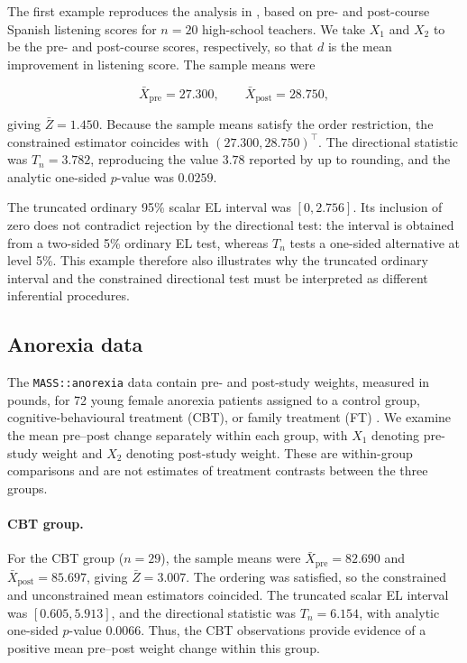 \documentclass[11pt]{article}
\theoremstyle{remark}
\begin{document}
The first example reproduces the analysis in \citet[Example~3]{el1996empirical}, based on pre- and post-course Spanish listening scores for $n=20$ high-school teachers. We take $X_1$ and $X_2$ to be the pre- and post-course scores, respectively, so that $d$ is the mean improvement in listening score. The sample means were

$$
\bar X_{\mathrm{pre}}=27.300,
\qquad
\bar X_{\mathrm{post}}=28.750,
$$

giving $\bar Z=1.450$. Because the sample means satisfy the order restriction, the constrained estimator coincides with $(27.300,28.750)^\top$. The directional statistic was $T_n=3.782$, reproducing the value $3.78$ reported by \citet{el1996empirical} up to rounding, and the analytic one-sided $p$-value was $0.0259$.

The truncated ordinary 95\% scalar EL interval was $[0,2.756]$. Its inclusion of zero does not contradict rejection by the directional test: the interval is obtained from a two-sided 5\% ordinary EL test, whereas $T_n$ tests a one-sided alternative at level 5\%. This example therefore also illustrates why the truncated ordinary interval and the constrained directional test must be interpreted as different inferential procedures.

\subsection{Anorexia data}

The \texttt{MASS::anorexia} data contain pre- and post-study weights, measured in pounds, for 72 young female anorexia patients assigned to a control group, cognitive-behavioural treatment (CBT), or family treatment (FT) \citet[Data set~285]{hand1993handbook,venables2002modern}. We examine the mean pre--post change separately within each group, with $X_1$ denoting pre-study weight and $X_2$ denoting post-study weight. These are within-group comparisons and are not estimates of treatment contrasts between the three groups.

\paragraph{CBT group.} For the CBT group ($n=29$), the sample means were $\bar X_{\mathrm{pre}}=82.690$ and $\bar X_{\mathrm{post}}=85.697$, giving $\bar Z=3.007$. The ordering was satisfied, so the constrained and unconstrained mean estimators coincided. The truncated scalar EL interval was $[0.605,5.913]$, and the directional statistic was $T_n=6.154$, with analytic one-sided $p$-value $0.0066$. Thus, the CBT observations provide evidence of a positive mean pre--post weight change within this group.
\end{document}
